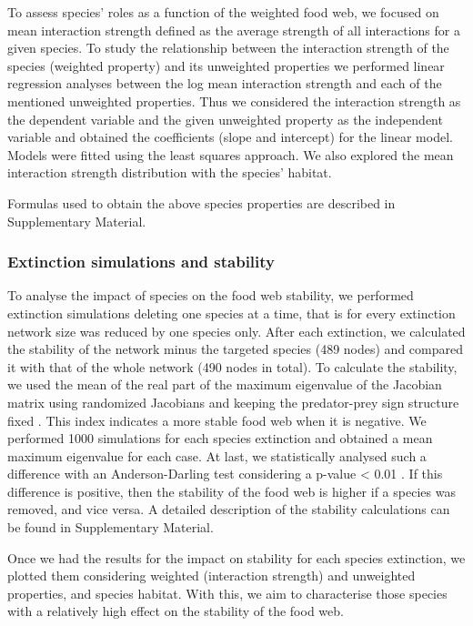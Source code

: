 \documentclass[gc, manuscript]{copernicus}
\begin{document}
To assess species' roles as a function of the weighted food web, we
focused on mean interaction strength defined as the average strength of
all interactions for a given species. To study the relationship between
the interaction strength of the species (weighted property) and its
unweighted properties we performed linear regression analyses between
the log mean interaction strength and each of the mentioned unweighted
properties. Thus we considered the interaction strength as the dependent
variable and the given unweighted property as the independent variable
and obtained the coefficients (slope and intercept) for the linear
model. Models were fitted using the least squares approach. We also
explored the mean interaction strength distribution with the species'
habitat.

Formulas used to obtain the above species properties are described in
Supplementary Material.

\subsubsection{Extinction simulations and stability}

To analyse the impact of species on the food web stability, we performed
extinction simulations deleting one species at a time, that is for every
extinction network size was reduced by one species only. After each
extinction, we calculated the stability of the network minus the
targeted species (489 nodes) and compared it with that of the whole
network (490 nodes in total). To calculate the stability, we used the
mean of the real part of the maximum eigenvalue of the Jacobian matrix
using randomized Jacobians and keeping the predator-prey sign structure
fixed \citep{Allesina2008, Grilli2016}. This index indicates a more
stable food web when it is negative. We performed 1000 simulations for
each species extinction and obtained a mean maximum eigenvalue for each
case. At last, we statistically analysed such a difference with an
Anderson-Darling test considering a p-value \textless{} 0.01
\citep{Scholz1987}. If this difference is positive, then the stability
of the food web is higher if a species was removed, and vice versa. A
detailed description of the stability calculations can be found in
Supplementary Material.

Once we had the results for the impact on stability for each species
extinction, we plotted them considering weighted (interaction strength)
and unweighted properties, and species habitat. With this, we aim to
characterise those species with a relatively high effect on the
stability of the food web.
\end{document}
